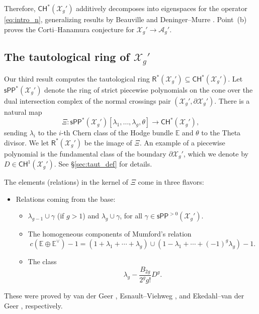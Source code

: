 \documentclass[11pt]{article}
\def\CH{\mathsf{CH}}
\def\R{\mathsf{R}}
\def\A{\mathcal{A}}
\def\X{\mathcal{X}}
\def\EE{\mathbb{E}}
\newcommand{\sPP}{\mathsf{sPP}}
\newcommand{\spp}{\sPP}
\theoremstyle{definition}
\begin{document}
Therefore, $\CH^*(\X_g')$ additively decomposes into eigenspaces for the operator \eqref{eq:intro_n}, generalizing results by Beauville \cite{Beauville86} and Deninger--Murre \cite{DM91}. Point~(b) proves the Corti--Hanamura conjecture \cite{CortiHanamura} for $\X_g' \to \A_g'$.

\subsection{The tautological ring of \texorpdfstring{$\X_g'$}{Xg'}}\label{sec:intro_taut}

Our third result computes the tautological ring $\R^*(\X_g') \subseteq \CH^*(\X_g')$. Let $\spp^{\ast}(\X_g')$ denote the ring of strict piecewise polynomials on the cone over the dual intersection complex of the normal crossings pair $(\X_g',\partial \X_g')$. There is a natural map
\begin{equation}\label{eq:xi}
    \Xi : \spp^{\ast}(\X_g')[\lambda_1,\ldots,\lambda_g,\theta] \to \CH^*(\X_g'),
\end{equation}
sending $\lambda_i$ to the $i$-th Chern class of the Hodge bundle $\EE$ and $\theta$ to the Theta divisor. We let $\R^*(\X_g')$ be the image of $\Xi$. An example of a piecewise polynomial is the fundamental class of the boundary $\partial \mathcal X_g'$, which we denote by $D \in \CH^1(\X_g')$. See \S \ref{sec:taut_def} for details.

The elements (relations) in the kernel of $\Xi$ come in three flavors:
\begin{itemize}
    \item[(a)] Relations coming from the base:
    \begin{itemize}
    \item[$\bullet$] $\lambda_{g-1}\cup\gamma$ (if $g > 1$) and $\lambda_g\cup\gamma$, for all
    $\gamma \in \spp^{>0}(\X_g')$.

    \item[$\bullet$] The homogeneous components of Mumford's relation
    \[
    c(\mathbb E \oplus \mathbb E^\vee)-1
    =
    (1+\lambda_1+\cdots+\lambda_g)\cup
    (1-\lambda_1+\cdots+(-1)^g\lambda_g)-1.
    \]
    \item[$\bullet$] The class
    \begin{equation}\label{eq:Pixtonclass}
        \lambda_g - \frac{B_{2g}}{2^g g!}D^g.
    \end{equation}
    \end{itemize}
\end{itemize}
These were proved by van der Geer \cite{vdG99}, Esnault--Viehweg \cite{EV04}, and Ekedahl--van der Geer \cite{EvdG05}, respectively.
\end{document}
